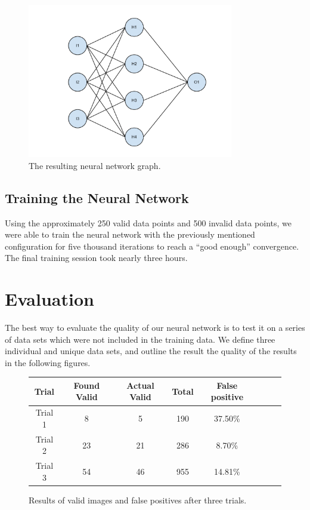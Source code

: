 \documentclass[conference]{IEEEtran}
\begin{document}
\begin{figure}
\centering
\includegraphics[width=90mm]{refs/nn.pdf}
\caption{The resulting neural network graph.}
\end{figure}

\subsection{Training the Neural Network}
Using the approximately 250 valid data points and 500 invalid data points, we
were able to train the neural network with the previously mentioned
configuration for five thousand iterations to reach a ``good enough''
convergence. The final training session took nearly three hours.

\section{Evaluation}
The best way to evaluate the quality of our neural network is to test it on a
series of data sets which were not included in the training data. We define
three individual and unique data sets, and outline the result the quality of
the results in the following figures.

    \begin{figure}
    \centering
    {\footnotesize
    \begin{tabular}{|c|c|c|c|c|c|c|c|}
        \hline
        \textbf{Trial} &  \textbf{Found Valid} & \textbf{Actual Valid} &
        \textbf{Total} & \textbf{False positive} \\\hline
        Trial 1 &   8 &   5 &   190 & 37.50\% \\\hline
        Trial 2 & 23 &  21 &  286 & 8.70\% \\\hline
        Trial 3 & 54 &  46 &  955 & 14.81\% \\\hline
    \end{tabular}
    }
    \caption{Results of valid images and false positives after three trials.}
    \end{figure}
\end{document}
